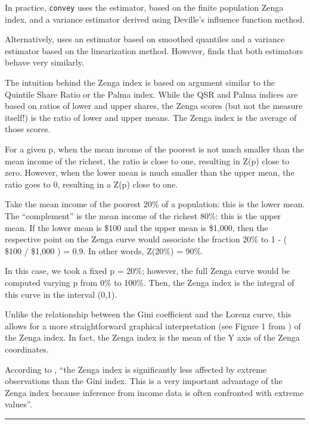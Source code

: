 \documentclass[
]{book}
\begin{document}
In practice, \texttt{convey} uses the \textcite{barabesi2016} estimator, based on the finite population Zenga index, and a variance estimator derived using Deville's \autocite*{deville1999} influence function method.

Alternatively, \textcite{langel2011} uses an estimator based on smoothed quantiles and a variance estimator based on the \textcite{demnati2004} linearization method. However, \textcite{barabesi2016} finds that both estimators behave very similarly.

The intuition behind the Zenga index is based on argument similar to the Quintile Share Ratio or the Palma index. While the QSR and Palma indices are based on ratios of lower and upper shares, the Zenga scores (but not the measure itself!) is the ratio of lower and upper means. The Zenga index is the average of those scores.

For a given p, when the mean income of the poorest is not much smaller than the mean income of the richest, the ratio is close to one, resulting in Z(p) close to zero. However, when the lower mean is much smaller than the upper mean, the ratio goes to 0, resulting in a Z(p) close to one.

Take the mean income of the poorest 20\% of a population: this is the lower mean. The ``complement'' is the mean income of the richest 80\%: this is the upper mean. If the lower mean is \$100 and the upper mean is \$1,000, then the respective point on the Zenga curve would associate the fraction 20\% to 1 - ( \$100 / \$1,000 ) = 0.9. In other words, Z(20\%) = 90\%.

In this case, we took a fixed p = 20\%; however, the full Zenga curve would be computed varying p from 0\% to 100\%. Then, the Zenga index is the integral of this curve in the interval (0,1).

Unlike the relationship between the Gini coefficient and the Lorenz curve, this allows for a more straightforward graphical interpretation (see Figure 1 from \textcite{langel2011}) of the Zenga index. In fact, the Zenga index is the mean of the Y axis of the Zenga coordinates.

According to \textcite{langel2011}, ``the Zenga index is significantly less affected by extreme observations than the Gini index. This is a very important advantage of the Zenga index because inference from income data is often confronted with extreme values''.

\begin{center}\rule{0.5\linewidth}{0.5pt}\end{center}
\end{document}
